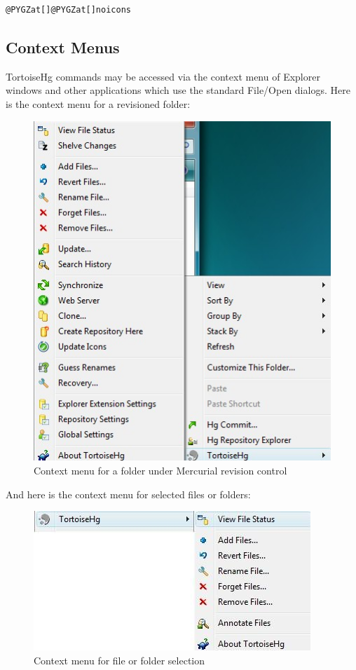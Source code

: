 \documentclass[letterpaper,10pt,english]{manual}
\begin{document}
\begin{Verbatim}[commandchars=@\[\]]
@PYGZat[]@PYGZat[]noicons
\end{Verbatim}


\subsection{Context Menus}

TortoiseHg commands may be accessed via the context menu of Explorer
windows and other applications which use the standard File/Open dialogs.
Here is the context menu for a revisioned folder:
\begin{figure}[htbp]
\centering

\includegraphics{cmenu-nofiles.jpg}
\caption{Context menu for a folder under Mercurial revision control}\end{figure}

And here is the context menu for selected files or folders:
\begin{figure}[htbp]
\centering

\includegraphics{cmenu-files.jpg}
\caption{Context menu for file or folder selection}\end{figure}
\end{document}
